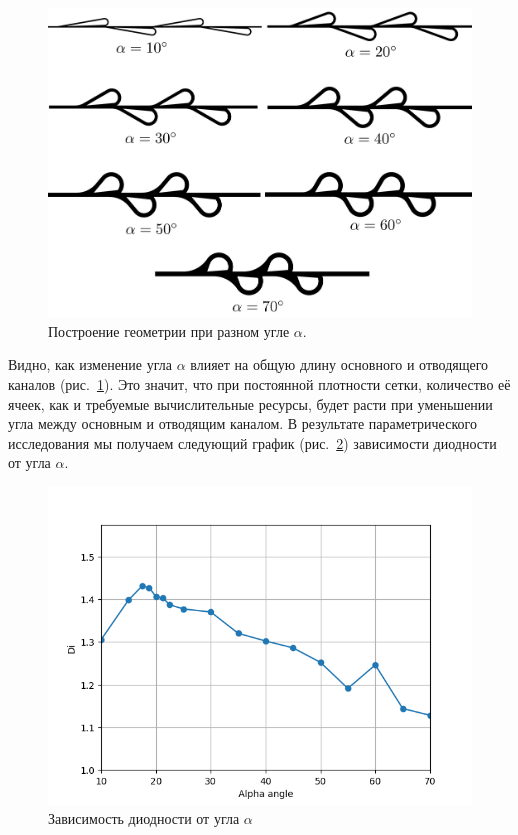 \documentclass[10pt,a4paper]{book}
\begin{document}
         \begin{figure}[H]
             \centering
             \includegraphics[width = 0.7\linewidth]{allAngle1}
             \caption{Построение геометрии при разном угле $\alpha$.}
             \label{fig:allAngle}
         \end{figure}
         
         
         Видно, как изменение угла $\alpha$ влияет на общую длину основного и отводящего каналов (рис.~\ref{fig:allAngle}). Это значит, что при постоянной плотности сетки, количество её ячеек, как и требуемые вычислительные ресурсы, будет расти при уменьшении угла между основным и отводящим каналом. В результате параметрического исследования мы получаем следующий график (рис.~\ref{fig:alphaAngle}) зависимости диодности от угла $ \alpha $.
         
         
         
         
         \begin{figure}[H]
             \centering
             \includegraphics[width = 1\linewidth]{alphaAngle}
             \caption{Зависимость диодности от угла $\alpha$}
             \label{fig:alphaAngle}
         \end{figure}
         
\end{document}
